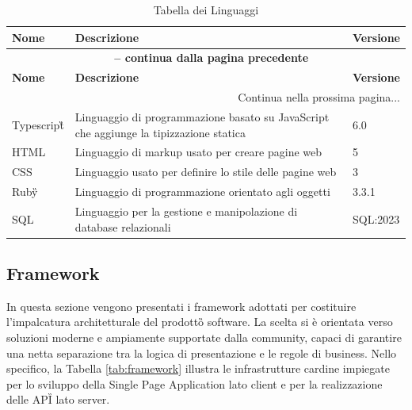 \documentclass[a4paper,11pt]{article}
\begin{document}
\begin{longtable}{|p{2cm}|p{7cm}|p{3cm}|}
\caption{Tabella dei Linguaggi}\label{tab:linguaggi}\\
\hline
\rowcolor{primaryblue!40}
\textbf{Nome} & \textbf{Descrizione} & \textbf{Versione} \\
\hline
\endfirsthead

\multicolumn{3}{c}{{\bfseries \tablename\ \thetable{} -- continua dalla pagina precedente}}\\
\hline
\rowcolor{primaryblue!40}
\textbf{Nome} & \textbf{Descrizione} & \textbf{Versione} \\
\hline
\endhead

\hline
\multicolumn{3}{|r|}{{Continua nella prossima pagina...}}\\
\hline
\endfoot

\hline
\endlastfoot
Typescript\G{} & Linguaggio di programmazione basato su JavaScript che aggiunge la tipizzazione statica & 6.0 \\
\hline
HTML & Linguaggio di markup usato per creare pagine web & 5 \\
\hline
CSS & Linguaggio usato per definire lo stile delle pagine web & 3 \\
\hline
Ruby\G{} & Linguaggio di programmazione orientato agli oggetti & 3.3.1 \\
\hline
SQL & Linguaggio per la gestione e manipolazione di database relazionali & SQL:2023 \\
\end{longtable}


\subsection{Framework}
In questa sezione vengono presentati i framework adottati per costituire l'impalcatura architetturale del prodotto\G{} software. La scelta si è orientata verso soluzioni moderne e ampiamente supportate dalla community, capaci di garantire una netta separazione tra la logica di presentazione e le regole di business. Nello specifico, la Tabella \ref{tab:framework} illustra le infrastrutture cardine impiegate per lo sviluppo della Single Page Application lato client e per la realizzazione delle API\G{} lato server.
\end{document}
